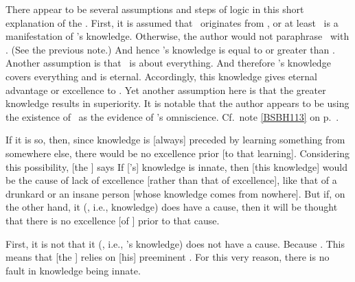 {There appear to be several assumptions and steps of logic in this short explanation of the \bhasya.  First, it is assumed that \sastra\ originates from \Isvara, or at least \sastra\ is a manifestation of \Isvara's knowledge.  Otherwise, the author would not paraphrase \sastra\ with \jnana.  (See the previous note.)  And hence \Isvara's knowledge is equal to or greater than \sastra.  Another assumption is that \sastra\ is about everything.   And therefore \Isvara's knowledge covers everything and is eternal.  Accordingly, this knowledge gives eternal advantage or excellence to \Isvara.  Yet another assumption here is that the greater knowledge results in superiority.  It is notable that the author appears to be using the existence of \sastra\ as the evidence of \Isvara's omniscience.  Cf.\ note \ref{BSBH113} on p.~\pageref{BSBH113}.}

If %
it is so, then, since knowledge is [always] preceded by learning something from somewhere else, there would be no excellence prior [to that learning].  Considering this possibility, [the \Bhasyakara] says   If [\Isvara's] knowledge is innate, then [this knowledge] would be the cause of lack of excellence [rather than that of excellence], like that of a drunkard or an insane person [whose knowledge comes from nowhere].  But if, on the other hand, it (\sastra, i.e., knowledge) does have a cause, then it will be thought that there is no excellence [of \Isvara] prior to that cause.

First, %
it is not that it (\sastra, i.e., \Isvara's knowledge) does not have a cause.  Because .  This means that [the \sastra] relies on [his] preeminent \sattva.  For this very reason, there is no fault in knowledge  being innate.

